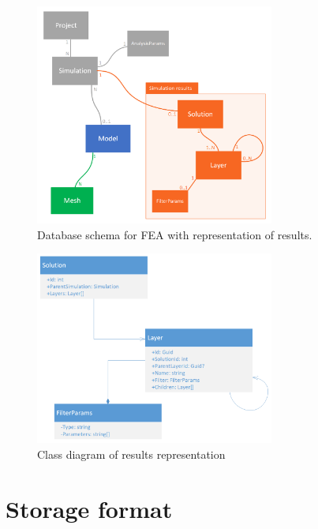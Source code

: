 \begin{figure}[H]
    \centering
    \includegraphics[width=0.7\textwidth]{figures/FEA-database-schema-with-results}
    \decoRule
    \caption{Database schema for FEA with representation of results.}
    \label{fig:FEA-db-schema-results}
\end{figure}

\begin{figure}[H]
    \centering
    \includegraphics[width=0.7\textwidth]{figures/layer-class-diagram}
    \decoRule
    \caption{Class diagram of results representation}
    \label{fig:results-class-diagram}
\end{figure}

\section{Storage format}
\label{sec:storage-format}


